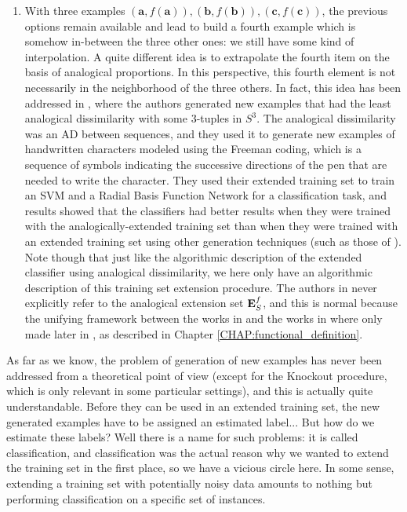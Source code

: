 \begin{enumerate}
\item With three examples $(\mathbf{a},f(\mathbf{a})),
  (\mathbf{b},f(\mathbf{b})), (\mathbf{c},f(\mathbf{c}))$, the previous options
    remain available and lead to build a fourth example which is somehow
    in-between the three other ones: we still have some kind of interpolation.
    A quite different idea is to extrapolate the fourth item on the basis of
    analogical proportions.  In this perspective, this fourth element is not
    necessarily in the neighborhood of the three others. In fact, this idea has
    been addressed in \cite{BayMouMicAnqECML07}, where the authors generated
    new examples that had the least analogical dissimilarity with some
    $3$-tuples in $S^3$. The analogical dissimilarity was an AD between
    sequences, and they used it to generate new examples of handwritten
    characters modeled using the Freeman coding, which is a sequence of symbols
    indicating the successive directions of the pen that are needed to write
    the character. They used their extended training set to train an SVM and a
    Radial Basis Function Network for a classification task, and results showed
    that the classifiers had better results when they were trained with the
    analogically-extended training set than when they were trained with an
    extended training set using other generation techniques (such as those of
    \cite{CanPerArlLlo06}).  Note though that just like the algorithmic
    description of the extended classifier using analogical dissimilarity, we
    here only have an algorithmic description of this training set extension
    procedure. The authors in \cite{BayMouMicAnqECML07} never explicitly refer
    to the analogical extension set $\mathbf{E}_{S}^{f}$, and this is normal because the
    unifying framework between the works in \cite{BayMicDelIJCAI07} and the
    works in \cite{StrYvoCNLL05} where only made later in
    \cite{HugPraRicSerECAI16}, as described in Chapter
    \ref{CHAP:functional_definition}.
\end{enumerate}


As far as we know, the problem of generation of new examples has never been
addressed from a theoretical point of view (except for the Knockout procedure,
which is only relevant in some particular settings), and this is actually quite
understandable. Before they can be used in an extended training set, the new
generated examples have to be assigned an estimated label... But how do we
estimate these labels? Well there is a name for such problems: it is called
classification, and classification was the actual reason why we wanted to
extend the training set in the first place, so we have a vicious circle here.
In some sense, extending a training set with potentially noisy data
amounts to nothing but performing classification on a specific set of
instances.

